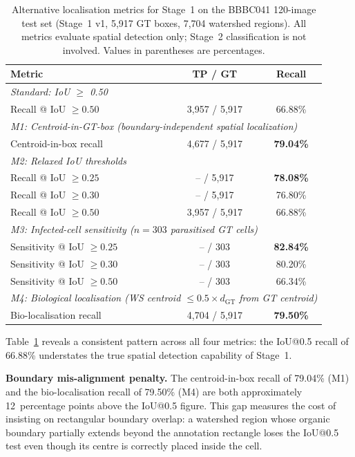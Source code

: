 \documentclass[review,12pt]{elsarticle}
\begin{document}
\begin{table}[H]
\centering
\small
\caption{Alternative localisation metrics for Stage~1 on the BBBC041
  120-image test set (Stage~1 v1, 5,917 GT boxes, 7,704 watershed regions).
  All metrics evaluate spatial detection only; Stage~2 classification is not
  involved.  Values in parentheses are percentages.}
\label{tab:alt_metrics}
\renewcommand{\arraystretch}{1.2}
\begin{tabular}{lcc}
\toprule
\textbf{Metric} & \textbf{TP / GT} & \textbf{Recall} \\
\midrule
\multicolumn{3}{l}{\textit{Standard: IoU $\geq$ 0.50}} \\
\quad Recall @ IoU $\geq 0.50$ & 3,957 / 5,917 & 66.88\% \\
\midrule
\multicolumn{3}{l}{\textit{M1: Centroid-in-GT-box (boundary-independent spatial localization)}} \\
\quad Centroid-in-box recall    & 4,677 / 5,917 & \textbf{79.04\%} \\
\midrule
\multicolumn{3}{l}{\textit{M2: Relaxed IoU thresholds}} \\
\quad Recall @ IoU $\geq 0.25$ & -- / 5,917 & \textbf{78.08\%} \\
\quad Recall @ IoU $\geq 0.30$ & -- / 5,917 & 76.80\% \\
\quad Recall @ IoU $\geq 0.50$ & 3,957 / 5,917 & 66.88\% \\
\midrule
\multicolumn{3}{l}{\textit{M3: Infected-cell sensitivity ($n = 303$ parasitised GT cells)}} \\
\quad Sensitivity @ IoU $\geq 0.25$ & -- / 303 & \textbf{82.84\%} \\
\quad Sensitivity @ IoU $\geq 0.30$ & -- / 303 & 80.20\% \\
\quad Sensitivity @ IoU $\geq 0.50$ & -- / 303 & 66.34\% \\
\midrule
\multicolumn{3}{l}{\textit{M4: Biological localisation (WS centroid $\leq 0.5 \times d_{\text{GT}}$ from GT centroid)}} \\
\quad Bio-localisation recall   & 4,704 / 5,917 & \textbf{79.50\%} \\
\bottomrule
\end{tabular}
\end{table}

Table~\ref{tab:alt_metrics} reveals a consistent pattern across all four
metrics: the IoU@0.5 recall of 66.88\% understates the true spatial
detection capability of Stage~1.

\textbf{Boundary mis-alignment penalty.}  The centroid-in-box recall
of 79.04\% (M1) and the bio-localisation recall of 79.50\% (M4) are
both approximately 12~percentage points above the IoU@0.5 figure.  This
gap measures the cost of insisting on rectangular boundary overlap: a
watershed region whose organic boundary partially extends beyond the
annotation rectangle loses the IoU@0.5 test even though its centre is
correctly placed inside the cell.
\end{document}
